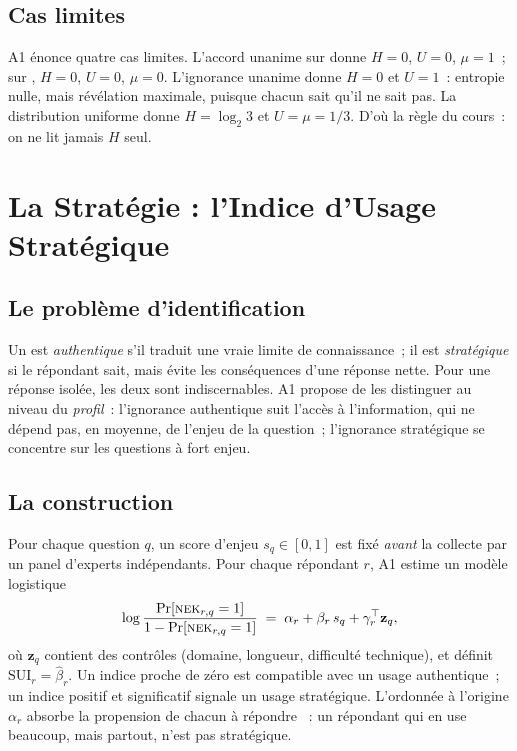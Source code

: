 \subsection{Cas limites}

A1 énonce quatre cas limites. L'accord unanime sur \OUI{} donne $H = 0$,
$U = 0$, $\mu = 1$~; sur \NON{}, $H = 0$, $U = 0$, $\mu = 0$. L'ignorance
unanime donne $H = 0$ et $U = 1$~: entropie nulle, mais révélation
maximale, puisque chacun sait qu'il ne sait pas. La distribution uniforme
donne $H = \log_2 3$ et $U = \mu = 1/3$. D'où la règle du cours~: on ne
lit jamais $H$ seul.

\section{La Stratégie : l'Indice d'Usage Stratégique}
\label{sec:c31-sui}

\subsection{Le problème d'identification}

Un \NEK{} est \emph{authentique} s'il traduit une vraie limite de
connaissance~; il est \emph{stratégique} si le répondant sait, mais évite
les conséquences d'une réponse nette. Pour une réponse isolée, les deux
sont indiscernables. A1 propose de les distinguer au niveau du
\emph{profil}~: l'ignorance authentique suit l'accès à l'information, qui
ne dépend pas, en moyenne, de l'enjeu de la question~; l'ignorance
stratégique se concentre sur les questions à fort enjeu.

\subsection{La construction}

Pour chaque question $q$, un score d'enjeu $s_q \in [0, 1]$ est fixé
\emph{avant} la collecte par un panel d'experts indépendants. Pour chaque
répondant $r$, A1 estime un modèle logistique
\[
    \log \frac{\Pr[\textsc{nek}{}_{r,q} = 1]}{1 - \Pr[\textsc{nek}{}_{r,q} = 1]}
    \;=\; \alpha_r + \beta_r\, s_q + \gamma_r^{\top} \mathbf{z}_q,
\]
où $\mathbf{z}_q$ contient des contrôles (domaine, longueur, difficulté
technique), et définit $\mathrm{SUI}_r = \hat\beta_r$. Un indice proche de
zéro est compatible avec un usage authentique~; un indice positif et
significatif signale un usage stratégique. L'ordonnée à l'origine
$\alpha_r$ absorbe la propension de chacun à répondre \NEK{}~: un
répondant qui en use beaucoup, mais partout, n'est pas stratégique.

